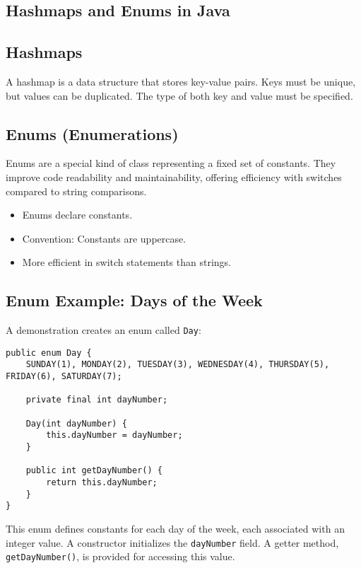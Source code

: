 \documentclass{article}
\begin{document}
\begin{itemize}
\section{Hashmaps and Enums in Java}

\subsection{Hashmaps}

A hashmap is a data structure that stores key-value pairs.  Keys must be unique, but values can be duplicated.  The type of both key and value must be specified.

\subsection{Enums (Enumerations)}

Enums are a special kind of class representing a fixed set of constants.  They improve code readability and maintainability, offering efficiency with switches compared to string comparisons.

\begin{itemize}
    \item Enums declare constants.
    \item Convention:  Constants are uppercase.
    \item More efficient in switch statements than strings.
\end{itemize}

\subsection{Enum Example: Days of the Week}

A demonstration creates an enum called \texttt{Day}:

\begin{verbatim}
public enum Day {
    SUNDAY(1), MONDAY(2), TUESDAY(3), WEDNESDAY(4), THURSDAY(5), FRIDAY(6), SATURDAY(7);

    private final int dayNumber;

    Day(int dayNumber) {
        this.dayNumber = dayNumber;
    }

    public int getDayNumber() {
        return this.dayNumber;
    }
}
\end{verbatim}

This enum defines constants for each day of the week, each associated with an integer value.  A constructor initializes the \texttt{dayNumber} field. A getter method, \texttt{getDayNumber()}, is provided for accessing this value.


\end{itemize}
\end{document}
